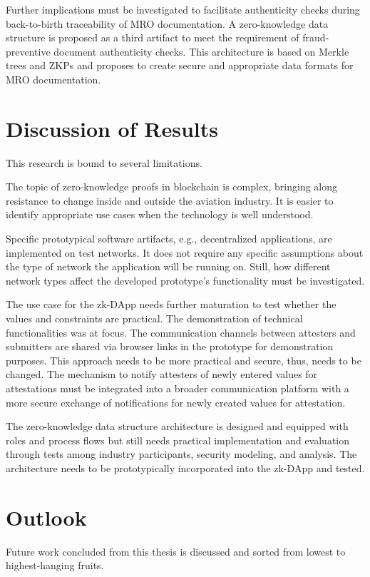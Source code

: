 Further implications must be investigated to facilitate authenticity checks during back-to-birth traceability of MRO documentation. A zero-knowledge data structure is proposed as a third artifact to meet the requirement of fraud-preventive document authenticity checks. This architecture is based on Merkle trees and ZKPs and proposes to create secure and appropriate data formats for MRO documentation.

\section{Discussion of Results}
This research is bound to several limitations. 

The topic of zero-knowledge proofs in blockchain is complex, bringing along resistance to change inside and outside the aviation industry. It is easier to identify appropriate use cases when the technology is well understood.

Specific prototypical software artifacts, e.g., decentralized applications,  are implemented on test networks. It does not require any specific assumptions about the type of network the application will be running on. Still, how different network types affect the developed prototype's functionality must be investigated.

The use case for the zk-DApp needs further maturation to test whether the values and constraints are practical. The demonstration of technical functionalities was at focus. The communication channels between attesters and submitters are shared via browser links in the prototype for demonstration purposes. This approach needs to be more practical and secure, thus, needs to be changed. The mechanism to notify attesters of newly entered values for attestations must be integrated into a broader communication platform with a more secure exchange of notifications for newly created values for attestation.

The zero-knowledge data structure architecture is designed and equipped with roles and process flows but still needs practical implementation and evaluation through tests among industry participants, security modeling, and analysis. The architecture needs to be prototypically incorporated into the zk-DApp and tested.
 
\begin{comment}
-noch die rapado project workshop slides durchschauen
\end{comment}

\section{Outlook}
Future work concluded from this thesis is discussed and sorted from lowest to highest-hanging fruits.

